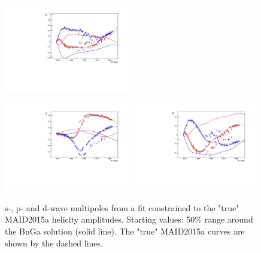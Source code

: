 \documentclass[a4paper,12pt]{report}
\begin{document}
\begin{figure}
\begin{center}
{    \includegraphics[width=0.49\textwidth]{BnGa/PenHeli/plots.0/E2m.pdf}
    }
    \centerline{
    \includegraphics[width=0.49\textwidth]{BnGa/PenHeli/plots.0/M2p.pdf}
    \includegraphics[width=0.49\textwidth]{BnGa/PenHeli/plots.0/M2m.pdf}
    }
    \caption{s-, p- and d-wave multipoles from a fit constrained to the "true" MAID2015a helicity amplitudes. 
    Starting values: 50\% range around the BnGa solution (solid line). The "true" MAID2015a curves are
    shown by the dashed lines.}
\label{Fig:const2}
  \end{center}
\end{figure}
\end{document}
